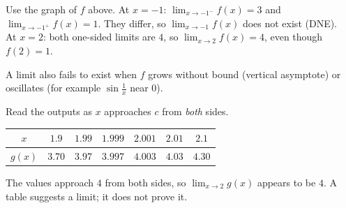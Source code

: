\documentclass[11pt]{article}
\begin{document}
\begin{center}
\end{center}
\begin{example}
Use the graph of $f$ above.
\sol At $x=-1$: $\displaystyle\lim_{x\to-1^-}f(x)=3$ and $\displaystyle\lim_{x\to-1^+}f(x)=1$. They differ, so $\displaystyle\lim_{x\to-1}f(x)$ does not exist (DNE).\\
At $x=2$: both one-sided limits are $4$, so $\displaystyle\lim_{x\to2}f(x)=4$, even though $f(2)=1$.
\end{example}
A limit also fails to exist when $f$ grows without bound (vertical asymptote) or oscillates (for example $\sin\frac1x$ near $0$).

Read the outputs as $x$ approaches $c$ from \emph{both} sides.
\begin{example}
\begin{center}\begin{tabular}{c|cccccc}
$x$ & $1.9$ & $1.99$ & $1.999$ & $2.001$ & $2.01$ & $2.1$\\\hline
$g(x)$ & $3.70$ & $3.97$ & $3.997$ & $4.003$ & $4.03$ & $4.30$
\end{tabular}\end{center}
\sol The values approach $4$ from both sides, so $\displaystyle\lim_{x\to2}g(x)$ appears to be $4$. A table suggests a limit; it does not prove it.
\end{example}
\end{document}

